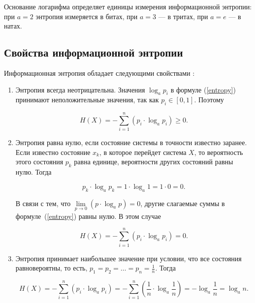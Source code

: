 Основание логарифма определяет единицы измерения информационной энтропии: при $a = 2$ энтропия измеряется в битах, при $a = 3$ --- в тритах, при $a = e$ --- в натах.

\subsection{Свойства информационной энтропии}\label{properties}

Информационная энтропия обладает следующими свойствами \cite{properties}:

\begin{enumerate}
	\item Энтропия всегда неотрицательна. Значения $\log_{a} p_{i}$ в формуле (\ref{entropy}) принимают неположительные значения, так как $p_{i} \in [0, 1]$. Поэтому
	
\begin{equation}
	H(X) = -\sum_{i = 1}^n (p_{i} \cdot \log_{a} p_{i}) \geqslant 0.
\end{equation}

	\item\label{property2} Энтропия равна нулю, если состояние системы в точности известно заранее. Если известно состояние $x_{k}$, в которое перейдет система $X$, то вероятность этого состояния $p_{k}$ равна единице, вероятности других состояний равны нулю. Тогда
	
\begin{equation}
	p_{k} \cdot \log_{a} p_{k} = 1 \cdot \log_{a} 1 = 1 \cdot 0 = 0.
\end{equation}

В связи с тем, что $\lim\limits_{p \to 0} (p \cdot \log_{a}p) = 0$, другие слагаемые суммы в формуле~(\ref{entropy}) равны нулю. В этом случае 

\begin{equation}
	H(X) = -\sum_{i = 1}^n (p_{i} \cdot \log_{a} p_{i}) = 0.
\end{equation}

	\item\label{property3} Энтропия принимает наибольшее значение при условии, что все состояния равновероятны, то есть, $p_{1} = p_{2} = \dots = p_{n} = \frac{1}{n}$. Тогда
	
\begin{equation}
	H(X) = -\sum_{i = 1}^n (p_{i} \cdot \log_{a} p_{i}) = -\sum_{i = 1}^n (\frac{1}{n} \cdot \log_{a} \frac{1}{n}) = -\log_{a} \frac{1}{n} = \log_{a} n.
\end{equation}
	
\end{enumerate}

